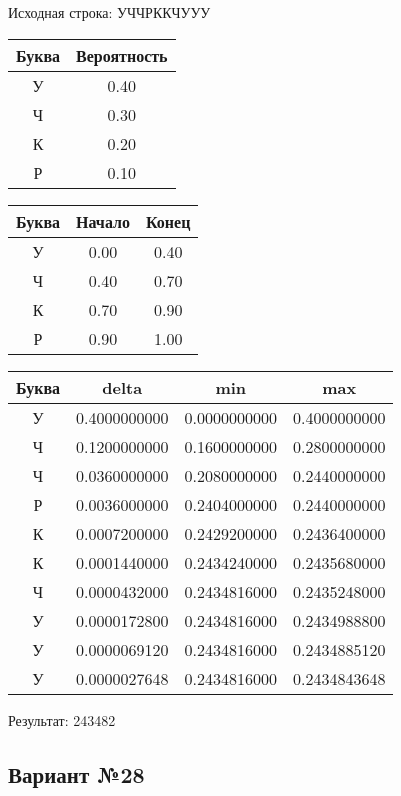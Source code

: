 \documentclass[a4paper, 12pt]{article}
\begin{document}
Исходная строка: УЧЧРККЧУУУ\
\begin{center}
 \begin{tabular}{ |c|c| } 
  \hline
     Буква & Вероятность \\ \hline
У & 0.40\\\hline
Ч & 0.30\\\hline
К & 0.20\\\hline
Р & 0.10
\\ \hline \end{tabular}
\end{center}
\begin{center}
 \begin{tabular}{ |c|c|c| } 
  \hline
     Буква & Начало & Конец \\ \hline
У & 0.00 & 0.40\\\hline
Ч & 0.40 & 0.70\\\hline
К & 0.70 & 0.90\\\hline
Р & 0.90 & 1.00
\\ \hline \end{tabular}
\end{center}
\begin{center}
 \begin{tabular}{ |c|c|c|c| } 
  \hline
     Буква & delta & min & max \\ \hline
У & 0.4000000000 & 0.0000000000 & 0.4000000000\\\hline
Ч & 0.1200000000 & 0.1600000000 & 0.2800000000\\\hline
Ч & 0.0360000000 & 0.2080000000 & 0.2440000000\\\hline
Р & 0.0036000000 & 0.2404000000 & 0.2440000000\\\hline
К & 0.0007200000 & 0.2429200000 & 0.2436400000\\\hline
К & 0.0001440000 & 0.2434240000 & 0.2435680000\\\hline
Ч & 0.0000432000 & 0.2434816000 & 0.2435248000\\\hline
У & 0.0000172800 & 0.2434816000 & 0.2434988800\\\hline
У & 0.0000069120 & 0.2434816000 & 0.2434885120\\\hline
У & 0.0000027648 & 0.2434816000 & 0.2434843648
\\ \hline \end{tabular}
\end{center}
Результат: 243482
\pagebreak
\subsection{Вариант №28}
\end{document}
